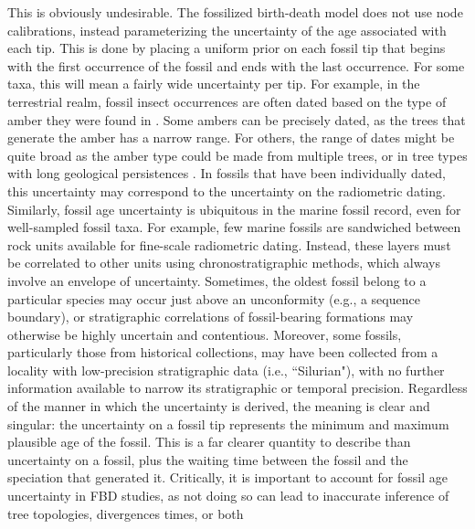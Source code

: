 \documentclass{article}
\begin{document}
This is obviously undesirable.
The fossilized birth-death model does not use node calibrations, instead parameterizing the uncertainty of the age associated with each tip.
This is done by placing a uniform prior on each fossil tip that begins with the first occurrence of the fossil and ends with the last occurrence. 
For some taxa, this will mean a fairly wide uncertainty per tip.
For example, in the terrestrial realm, fossil insect occurrences are often dated based on the type of amber they were found in \citep{lapolla2013}. Some ambers can be precisely dated, as the trees that generate the amber has a narrow range.
For others, the range of dates might be quite broad as the amber type could be made from multiple trees, or in tree types with long geological persistences \citep{poinar2000}. In fossils that have been individually dated, this uncertainty may correspond to the uncertainty on the radiometric dating. Similarly, fossil age uncertainty is ubiquitous in the marine fossil record, even for well-sampled fossil taxa. For example, few marine fossils are sandwiched between rock units available for fine-scale radiometric dating. Instead, these layers must be correlated to other units using chronostratigraphic methods, which always involve an envelope of uncertainty. Sometimes, the oldest fossil belong to a particular species may occur just above an unconformity (e.g., a sequence boundary), or stratigraphic correlations of fossil-bearing formations may otherwise be highly uncertain and contentious. Moreover, some fossils, particularly those from historical collections, may have been collected from a locality with low-precision stratigraphic data (i.e., ``Silurian"), with no further information available to narrow its stratigraphic or temporal precision. 
Regardless of the manner in which the uncertainty is derived, the meaning is clear and singular: the uncertainty on a fossil tip represents the minimum and maximum plausible age of the fossil.
This is a far clearer quantity to describe than uncertainty on a fossil, plus the waiting time between the fossil and the speciation that generated it. Critically, it is important to account for fossil age uncertainty in FBD studies, as not doing so can lead to inaccurate inference of tree topologies, divergences times, or both \citep{BaridoSottani2019a,BaridoSottaniEtAl2020}
\end{document}
